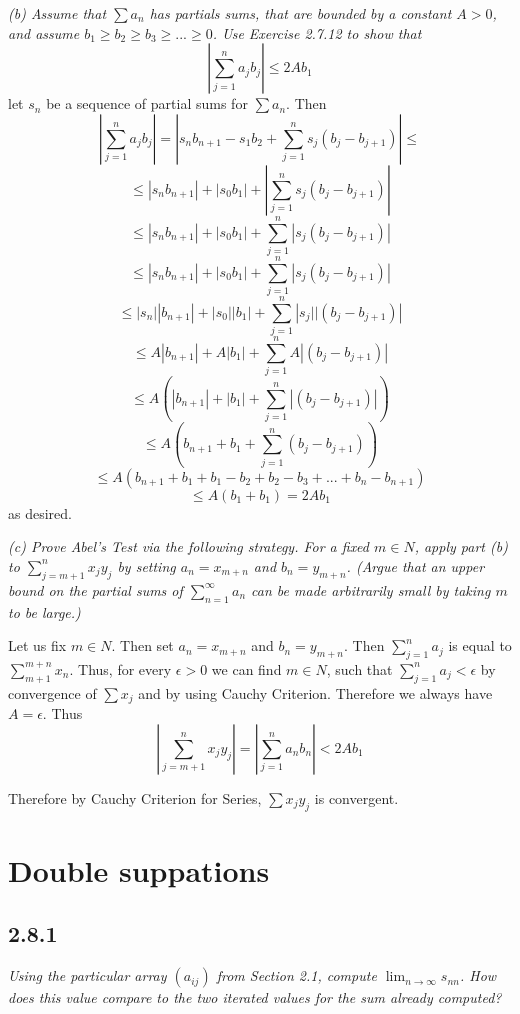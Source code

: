 \documentclass[11pt,oneside,titlepage]{book}
\begin{document}
\textit{(b) Assume that $\sum a_n$ has partials sums, that are bounded by a
  constant $A > 0$, and assume $b_1 \geq b_2 \geq b_3 \geq ... \geq 0$. Use
  Exercise 2.7.12 to show that }
$$\left|\sum_{j = 1}^{n} a_j b_j \right| \leq 2 A b_1$$
let $s_n$ be a sequence of partial sums for $\sum a_n$. Then
$$\left|\sum_{j = 1}^{n} a_j b_j \right| = \left|s_n b_{n + 1} - s_1 b_2 + \sum_{j = 1}^{n} s_j (b_j - b_{j + 1})\right| \leq $$
$$\leq |s_n b_{n + 1}| + |s_0 b_1| + \left|\sum_{j = 1}^{n} s_j (b_j - b_{j + 1})\right| $$
$$\leq |s_n b_{n + 1}| + |s_0 b_1| + \sum_{j = 1}^{n} \left|s_j (b_j - b_{j + 1})\right| $$
$$\leq |s_n b_{n + 1}| + |s_0 b_1| + \sum_{j = 1}^{n} \left|s_j (b_j - b_{j + 1})\right| $$
$$\leq |s_n ||b_{n + 1}| + |s_0 ||b_1| + \sum_{j = 1}^{n} \left|s_j|| (b_j - b_{j + 1})\right| $$
$$\leq A|b_{n + 1}| + A|b_1| + \sum_{j = 1}^{n} A \left| (b_j - b_{j + 1})\right| $$
$$\leq A(|b_{n + 1}| + |b_1| + \sum_{j = 1}^{n}  \left| (b_j - b_{j + 1})\right| )$$
$$\leq A(b_{n + 1} + b_1 + \sum_{j = 1}^{n}   (b_j - b_{j + 1}) )$$
$$\leq A(b_{n + 1} + b_1 + b_1 - b_2 + b_2 - b_3 + ... + b_n - b_{n + 1}) $$
$$\leq A(b_1 + b_1) = 2 A b_1 $$
as desired.

\textit{(c) Prove Abel's Test via the following strategy. For a fixed
  $m \in N$, apply part (b) to $\sum_{j = m + 1}^{n} x_j y_j $ by setting
  $a_n = x_{m + n}$ and $b_n = y_{m + n}$. (Argue that an upper bound on the
  partial sums of $\sum_{n = 1}^{\infty} a_n$ can be made arbitrarily small by
  taking $m$ to be large.)}

Let us fix $m \in N$. Then set $a_n = x_{m + n}$ and $b_n = y_{m + n}$. Then
$\sum_{j = 1}^{n} a_j$ is equal to $\sum_{m + 1}^{m + n} x_n$. Thus, for every
$\epsilon > 0$ we can find $m \in N$, such that
$\sum_{j = 1}^{n}a_j < \epsilon$ by convergence of $\sum x_j$ and by using
Cauchy Criterion. Therefore we always have $A = \epsilon$. Thus
$$|\sum_{j = m + 1}^{n} x_j y_j|= |\sum_{j = 1}^{n} a_n b_n| <2 A b_1$$

Therefore by Cauchy Criterion for Series, $\sum x_j y_j$ is convergent.

\section{Double suppations}

\subsection*{2.8.1}
\textit{Using the particular array $(a_{ij})$ from  Section 2.1, compute
  $\lim_{n \to \infty} s_{nn}$. How does this value compare to the two
  iterated values for the sum already computed? }
\end{document}
